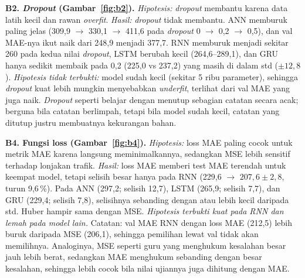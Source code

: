 \documentclass[conference,a4paper]{IEEEtran}
\begin{document}
\textbf{B2. \textit{Dropout} (Gambar~\ref{fig:b2}).} \textit{Hipotesis:} \textit{dropout} membantu karena data latih kecil dan rawan \textit{overfit}. \textit{Hasil:} \textit{dropout} tidak membantu. ANN memburuk paling jelas (309,9 $\to$ 330,1 $\to$ 411,6 pada \textit{dropout} 0 $\to$ 0,2 $\to$ 0,5), dan val MAE-nya ikut naik dari 248,9 menjadi 377,7. RNN memburuk menjadi sekitar 260 pada kedua nilai \textit{dropout}, LSTM berubah kecil (264,6--289,1), dan GRU hanya sedikit membaik pada 0,2 (225,0 vs 237,2) yang masih di dalam std ($\pm 12{,}8$). \textit{Hipotesis tidak terbukti:} model sudah kecil (sekitar 5 ribu parameter), sehingga \textit{dropout} kuat lebih mungkin menyebabkan \textit{underfit}, terlihat dari val MAE yang juga naik. \textit{Dropout} seperti belajar dengan menutup sebagian catatan secara acak; berguna bila catatan berlimpah, tetapi bila model sudah kecil, catatan yang ditutup justru membuatnya kekurangan bahan.
 
\textbf{B4. Fungsi loss (Gambar~\ref{fig:b4}).} \textit{Hipotesis:} loss MAE paling cocok untuk metrik MAE karena langsung meminimalkannya, sedangkan MSE lebih sensitif terhadap lonjakan trafik. \textit{Hasil:} loss MAE memberi test MAE terendah untuk keempat model, tetapi selisih besar hanya pada RNN (229,6 $\to$ $207{,}6 \pm 2{,}8$, turun 9,6\,\%). Pada ANN (297,2; selisih 12,7), LSTM (265,9; selisih 7,7), dan GRU (229,4; selisih 7,8), selisihnya sebanding dengan atau lebih kecil daripada std. Huber hampir sama dengan MSE. \textit{Hipotesis terbukti kuat pada RNN dan lemah pada model lain.} Catatan: val MAE RNN dengan loss MAE (212,5) lebih buruk daripada MSE (206,1), sehingga pemilihan lewat val tidak akan memilihnya. Analoginya, MSE seperti guru yang menghukum kesalahan besar jauh lebih berat, sedangkan MAE menghukum sebanding dengan besar kesalahan, sehingga lebih cocok bila nilai ujiannya juga dihitung dengan MAE.
 
\end{document}
